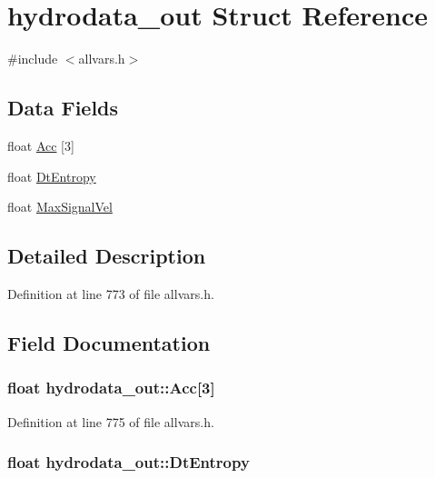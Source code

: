 \hypertarget{structhydrodata__out}{
\section{hydrodata\_\-out Struct Reference}
\label{structhydrodata__out}
}


{\ttfamily \#include $<$allvars.h$>$}

\subsection*{Data Fields}
\begin{DoxyCompactItemize}
\item 
float \hyperlink{structhydrodata__out_a7b3945aaa01f12e5af8be7731b362661}{Acc} \mbox{[}3\mbox{]}
\item 
float \hyperlink{structhydrodata__out_a0bd5bd8b7c1ec82abf3e5f001543441c}{DtEntropy}
\item 
float \hyperlink{structhydrodata__out_a6f4c65630e80c636a128d59e0afc4dad}{MaxSignalVel}
\end{DoxyCompactItemize}


\subsection{Detailed Description}


Definition at line 773 of file allvars.h.



\subsection{Field Documentation}
\hypertarget{structhydrodata__out_a7b3945aaa01f12e5af8be7731b362661}{
\subsubsection[{Acc}]{\setlength{\rightskip}{0pt plus 5cm}float {\bf hydrodata\_\-out::Acc}\mbox{[}3\mbox{]}}}
\label{structhydrodata__out_a7b3945aaa01f12e5af8be7731b362661}


Definition at line 775 of file allvars.h.

\hypertarget{structhydrodata__out_a0bd5bd8b7c1ec82abf3e5f001543441c}{
\subsubsection[{DtEntropy}]{\setlength{\rightskip}{0pt plus 5cm}float {\bf hydrodata\_\-out::DtEntropy}}}
\label{structhydrodata__out_a0bd5bd8b7c1ec82abf3e5f001543441c}


